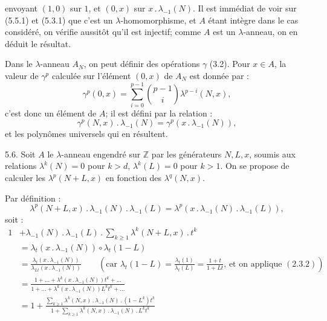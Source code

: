 
envoyant \((1,0)\) sur \(1\), et \((0,x)\) sur \(x\mathbin{.}\lambda_{-1}(N)\). Il est immédiat de voir sur (5.5.1) et (5.3.1) que c'est un \(\lambda\)-homomorphisme, et \(A\) étant intègre dans le cas considéré, on vérifie aussitôt qu'il est injectif; comme \(A\) est un \(\lambda\)-anneau, on en déduit le résultat.

Dans le \(\lambda\)-anneau \(A_N\), on peut définir des opérations \(\gamma\) (3.2). Pour \(x\in A\), la valeur de \(\gamma^p\) calculée sur l'élément \((0,x)\) de \(A_N\) est donnée par :
\[
  \gamma^p(0,x)=\sum_{i=0}^{p-1}\binom{p-1}{i}\lambda^{p-i}(N,x),
\]
c'est donc un élément de \(A\); il est défini par la relation :
\begin{equation}\tag{5.5.4}
  \gamma^p(N,x)\mathbin{.}\lambda_{-1}(N)=\gamma^p(x\mathbin{.}\lambda_{-1}(N)),
\end{equation}
et les polynômes universels qui en résultent.


5.6. Soit \(A\) le \(\lambda\)-anneau engendré sur \(\mathbb Z\) par les générateurs \(N,L,x\), soumis aux relations \(\lambda^k(N)=0\) pour \(k>d\), \(\lambda^k(L)=0\) pour \(k>1\). On se propose de calculer les \(\lambda^p(N+L,x)\) en fonction des \(\lambda^q(N,x)\).

Par définition :
\[
  \lambda^p(N+L,x)\mathbin{.}\lambda_{-1}(N)\mathbin{.}\lambda_{-1}(L)
  =\lambda^p(x\mathbin{.}\lambda_{-1}(N)\mathbin{.}\lambda_{-1}(L)),
\]
soit :
\[
\begin{aligned}
1&+\lambda_{-1}(N)\mathbin{.}\lambda_{-1}(L)\mathbin{.}\sum_{k\ge1}\lambda^k(N+L,x)\mathbin{.} t^k \\
 &=\lambda_t(x\mathbin{.}\lambda_{-1}(N))\circ \lambda_t(1-L) \\
 &=\frac{\lambda_t(x\mathbin{.}\lambda_{-1}(N))}{\lambda_{Lt}(x\mathbin{.}\lambda_{-1}(N))}
   \qquad\left(\text{car }\lambda_t(1-L)=\frac{\lambda_t(1)}{\lambda_t(L)}=\frac{1+t}{1+Lt}\text{, et on applique }(2.3.2)\right) \\
 &=\frac{1+\ldots+\lambda^k(x\mathbin{.}\lambda_{-1}(N))t^k+\ldots}{1+\ldots+\lambda^k(x\mathbin{.}\lambda_{-1}(N))L^k t^k+\ldots} \\
 &=1+\frac{\sum_{k\ge1}\lambda^k(N,x)\mathbin{.}\lambda_{-1}(N)\mathbin{.}(1-L^k)t^k}{1+\sum_{k\ge1}\lambda^k(N,x)\mathbin{.}\lambda_{-1}(N)\mathbin{.} L^k t^k}
\end{aligned}
\]

